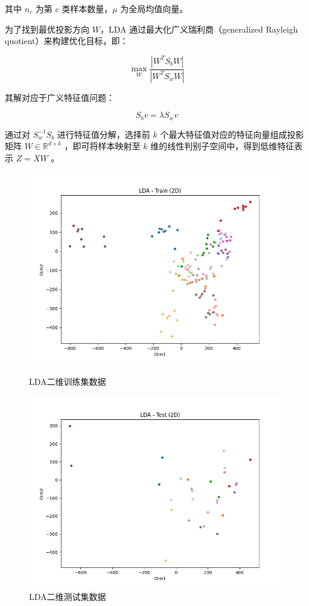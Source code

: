 \documentclass[a4paper, utf8]{ctexart}
\begin{document}
	其中 $n_c$ 为第 $c$ 类样本数量，$\mu$ 为全局均值向量。
	
	为了找到最优投影方向 $W$，LDA 通过最大化广义瑞利商（generalized Rayleigh quotient）来构建优化目标，即：
	
	\vspace{-.5em}
	\begin{equation}
		\max\limits_{W} \frac{\left| W^T S_b W \right|}{\left| W^T S_w W \right|}
	\end{equation}
	 
	其解对应于广义特征值问题：
	
	\vspace{-.5em}
	\begin{equation}
		S_b v = \lambda S_w v
	\end{equation}
	
	通过对 $S_w^{-1} S_b$ 进行特征值分解，选择前 $k$ 个最大特征值对应的特征向量组成投影矩阵 $W \in \mathbb{R}^{d \times k}$ ，即可将样本映射至 $k$ 维的线性判别子空间中，得到低维特征表示 $Z = XW$ 。
	
	\begin{figure}[htbp]
		\centering
		\begin{minipage}{.45\textwidth}
			\centering
			\includegraphics[width=.8\textwidth]{./figure/LDAtrain.png}
			\caption{LDA二维训练集数据}
		\end{minipage}
		\begin{minipage}{.45\textwidth}
			\centering
			\includegraphics[width=.8\textwidth]{./figure/LDAtest.png}
			\caption{LDA二维测试集数据}
		\end{minipage}
	\end{figure}
	
\end{document}
